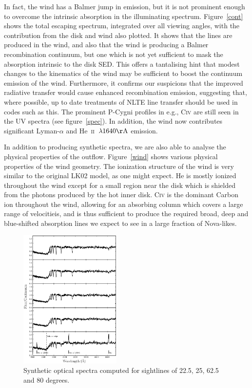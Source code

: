 \documentclass[preprint, a4paper, 11pt]{aastex}
\begin{document}
In fact, the wind has a Balmer jump in emission, but it is not prominent enough
to overcome the intrinsic absorption in the illuminating spectrum. 
Figure~\ref{cont} shows the total escaping spectrum, integrated
over all viewing angles, with the contribution from the disk and wind
also plotted. It shows that the lines are produced in the wind,
and also that the wind is producing a Balmer recombination
continuum, but one which is not yet sufficient to mask the absorption 
intrinsic to the disk SED. This offers a tantalising hint
that modest changes to the kinematics of the wind
may be sufficient to boost the continuum emission of the wind.
Furthermore, it confirms our suspicions that the improved
radiative transfer would cause enhanced recombination emission,
suggesting that, where possible, up to date treatments of
NLTE line transfer should be used in codes such as this.
The prominent P-Cygni profiles in e.g., C\textsc{iv} are still seen
in the UV spectra (see figure~\ref{spec}). In addition, the wind 
now contributes significant Lyman-$\alpha$ and
He~\textsc{ii}~$\lambda1640{\rm \AA}$  emission. 

In addition to producing synthetic spectra, we are also able to 
analyse the physical properties of the outflow.
Figure~\ref{wind} shows various physical properties
of the wind geometry. The ionization structure of the wind
is very similar to the original LK02 model, as one might expect.
He is mostly ionized throughout the wind except for a small region near
the disk which is shielded from the photons produced by the hot inner disk.
C\textsc{iv} is the dominant Carbon ion throughout the wind, allowing
for an absorbing column which covers a large range of velocitieis, and is thus
sufficient to produce the required broad, deep and blue-shifted absorption lines
we expect to see in a large fraction of Nova-likes.

\begin{figure} 
\includegraphics[width=0.45\textwidth]{figures/fig6_opt_cont.eps}
\caption{Synthetic optical spectra computed for 
sightlines of 22.5, 25, 62.5 and 80 degrees.}
\label{spec_continuum}
\end{figure} 
\end{document}
